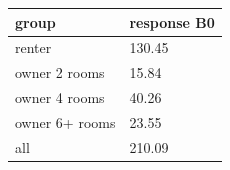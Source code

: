 \begingroup\small
\setlength{\tabcolsep}{3pt}
\renewcommand{\arraystretch}{1.04}
\begin{tabularx}{\linewidth}{XX}
\toprule
group & response B0 \\
\midrule
renter & 130.45 \\
owner 2 rooms & 15.84 \\
owner 4 rooms & 40.26 \\
owner 6+ rooms & 23.55 \\
all & 210.09 \\
\bottomrule
\end{tabularx}
\endgroup
